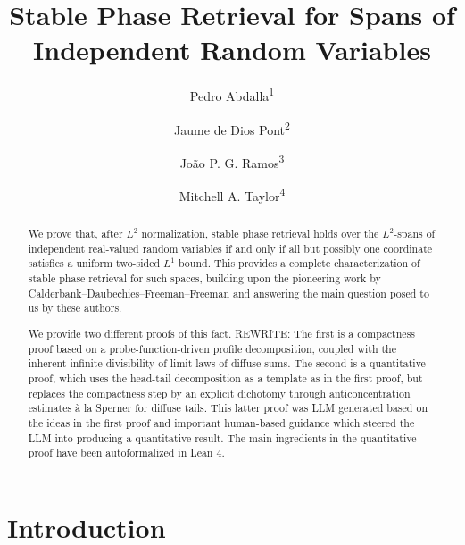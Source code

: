 \documentclass[11pt]{amsart}
\title[Stable Phase Retrieval for Independent Coordinates]{Stable Phase Retrieval for Spans of Independent Random Variables}
\author{Pedro Abdalla\textsuperscript{1}}
\author{Jaume de Dios Pont\textsuperscript{2}}
\author{Jo\~ao P. G. Ramos\textsuperscript{3}}
\author{Mitchell A. Taylor\textsuperscript{4}}
\numberwithin{equation}{section}
\theoremstyle{definition}
\theoremstyle{remark}
\begin{document}

\begin{abstract} We prove that, after $L^2$ normalization, stable phase retrieval
holds over the $L^2$-spans of independent real-valued random variables if and only if all but possibly one coordinate satisfies a uniform two-sided
$L^1$ bound. This provides a complete characterization of stable phase retrieval for such spaces, building upon the pioneering work by Calderbank--Daubechies--Freeman--Freeman and answering the main question posed to us by these authors.

We provide two different proofs of this fact. {\color{red} REWRITE: The first is a compactness proof
based on a probe-function-driven profile decomposition, coupled with the inherent infinite divisibility of limit laws of diffuse sums. The second is a quantitative proof, which uses the head-tail decomposition as a template as in the first proof, but replaces the compactness step by an explicit dichotomy through anticoncentration estimates à la Sperner for diffuse tails.} This latter proof was LLM generated based on the ideas in the first proof and important human-based guidance which steered the LLM into producing a quantitative result. The main ingredients in the quantitative proof have been autoformalized in Lean 4. 
\end{abstract}

\maketitle
\begingroup
\renewcommand{\thefootnote}{\arabic{footnote}}
\endgroup
\setcounter{footnote}{0}

\section{Introduction}
\end{document}
